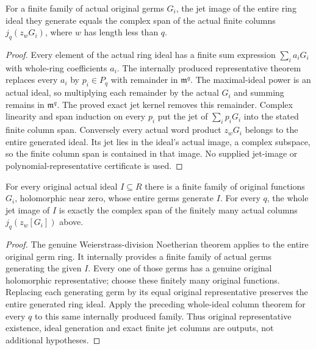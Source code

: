\begin{theorem}
\label{hir:actual-whole-generated-ideal-finite-jet-columns}
\leanok
{}
For a finite family of actual original germs $G_i$, the jet image of the
entire ring ideal they generate equals the complex span of the actual
finite columns $j_q(z_wG_i)$, where $w$ has length less than $q$.
\end{theorem}
\begin{proof}
Every element of the actual ring ideal has a finite sum expression
$\sum_i a_iG_i$ with whole-ring coefficients $a_i$. The internally produced
representative theorem replaces every $a_i$ by $p_i\in P_q$ with remainder
in $\mathfrak m^q$. The maximal-ideal power is an actual ideal, so multiplying
each remainder by the actual $G_i$ and summing remains in $\mathfrak m^q$.
The proved exact jet kernel removes this remainder. Complex linearity and
span induction on every $p_i$ put the jet of $\sum_i p_iG_i$ into the stated
finite column span. Conversely every actual word product $z_wG_i$ belongs
to the entire generated ideal. Its jet lies in the ideal's actual image,
a complex subspace, so the finite column span is contained in that image.
No supplied jet-image or polynomial-representative certificate is used.
\end{proof}

\begin{theorem}
\label{hir:actual-every-original-ideal-finite-jet-columns}
\leanok
{}
For every original actual ideal $I\subseteq R$ there is a finite family of
original functions $G_i$, holomorphic near zero, whose entire germs generate
$I$. For every $q$, the whole jet image of $I$ is exactly the complex span of
the finitely many actual columns $j_q(z_w[G_i])$ above.
\end{theorem}
\begin{proof}
The genuine Weierstrass-division Noetherian theorem applies to the entire
original germ ring. It internally provides a finite family of actual germs
generating the given $I$. Every one of those germs has a genuine original
holomorphic representative; choose these finitely many original functions.
Replacing each generating germ by its equal original representative
preserves the entire generated ring ideal. Apply the preceding whole-ideal
column theorem for every $q$ to this same internally produced family.
Thus original representative existence, ideal generation and exact finite
jet columns are outputs, not additional hypotheses.
\end{proof}

